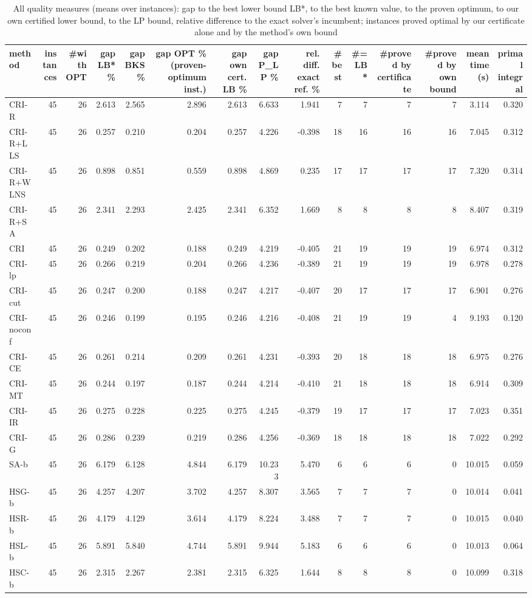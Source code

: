 \begin{table}[htbp]
\centering
\small
\caption{All quality measures (means over instances): gap to the best lower bound LB*, to the best known value, to the proven optimum, to our own certified lower bound, to the LP bound, relative difference to the exact solver's incumbent; instances proved optimal by our certificate alone and by the method's own bound}
\label{tab:E5_ablation_b10_all_metrics}
\begin{tabular}{lrrrrrrrrrrrrrr}
\toprule
method & instances & \#with OPT & gap LB* \% & gap BKS \% & gap OPT \% (proven-optimum inst.) & gap own cert. LB \% & gap P\_LP \% & rel. diff. exact ref. \% & \#best & \#= LB* & \#proved by certificate & \#proved by own bound & mean time (s) & primal integral \\
\midrule
CRI-R & 45 & 26 & 2.613 & 2.565 & 2.896 & 2.613 & 6.633 & 1.941 & 7 & 7 & 7 & 7 & 3.114 & 0.320 \\
CRI-R+LLS & 45 & 26 & 0.257 & 0.210 & 0.204 & 0.257 & 4.226 & -0.398 & 18 & 16 & 16 & 16 & 7.045 & 0.312 \\
CRI-R+WLNS & 45 & 26 & 0.898 & 0.851 & 0.559 & 0.898 & 4.869 & 0.235 & 17 & 17 & 17 & 17 & 7.320 & 0.314 \\
CRI-R+SA & 45 & 26 & 2.341 & 2.293 & 2.425 & 2.341 & 6.352 & 1.669 & 8 & 8 & 8 & 8 & 8.407 & 0.319 \\
CRI & 45 & 26 & 0.249 & 0.202 & 0.188 & 0.249 & 4.219 & -0.405 & 21 & 19 & 19 & 19 & 6.974 & 0.312 \\
CRI-lp & 45 & 26 & 0.266 & 0.219 & 0.204 & 0.266 & 4.236 & -0.389 & 21 & 19 & 19 & 19 & 6.978 & 0.278 \\
CRI-cut & 45 & 26 & 0.247 & 0.200 & 0.188 & 0.247 & 4.217 & -0.407 & 20 & 17 & 17 & 17 & 6.901 & 0.276 \\
CRI-noconf & 45 & 26 & 0.246 & 0.199 & 0.195 & 0.246 & 4.216 & -0.408 & 21 & 19 & 19 & 4 & 9.193 & 0.120 \\
CRI-CE & 45 & 26 & 0.261 & 0.214 & 0.209 & 0.261 & 4.231 & -0.393 & 20 & 18 & 18 & 18 & 6.975 & 0.276 \\
CRI-MT & 45 & 26 & 0.244 & 0.197 & 0.187 & 0.244 & 4.214 & -0.410 & 21 & 18 & 18 & 18 & 6.914 & 0.309 \\
CRI-IR & 45 & 26 & 0.275 & 0.228 & 0.225 & 0.275 & 4.245 & -0.379 & 19 & 17 & 17 & 17 & 7.023 & 0.351 \\
CRI-G & 45 & 26 & 0.286 & 0.239 & 0.219 & 0.286 & 4.256 & -0.369 & 18 & 18 & 18 & 18 & 7.022 & 0.292 \\
SA-b & 45 & 26 & 6.179 & 6.128 & 4.844 & 6.179 & 10.233 & 5.470 & 6 & 6 & 6 & 0 & 10.015 & 0.059 \\
HSG-b & 45 & 26 & 4.257 & 4.207 & 3.702 & 4.257 & 8.307 & 3.565 & 7 & 7 & 7 & 0 & 10.014 & 0.041 \\
HSR-b & 45 & 26 & 4.179 & 4.129 & 3.614 & 4.179 & 8.224 & 3.488 & 7 & 7 & 7 & 0 & 10.015 & 0.040 \\
HSL-b & 45 & 26 & 5.891 & 5.840 & 4.744 & 5.891 & 9.944 & 5.183 & 6 & 6 & 6 & 0 & 10.013 & 0.064 \\
HSC-b & 45 & 26 & 2.315 & 2.267 & 2.381 & 2.315 & 6.325 & 1.644 & 8 & 8 & 8 & 0 & 10.099 & 0.318 \\
\bottomrule
\end{tabular}
\end{table}
